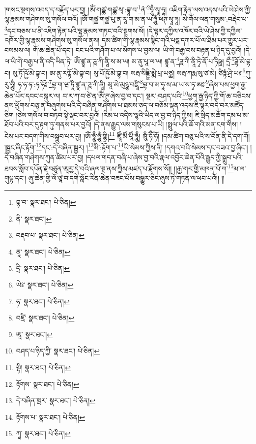 །གསང་སྔགས་འབད་ད་བརྗོད་པར་བྱ། །ཨོཾ་གཙྪ་གཙྪ་སྭ་:བྷཱ་བ་\footnote{བྷ་བ་  སྣར་ཐང་།  པེ་ཅིན། }ནཾ་\footnote{ནི་  སྣར་ཐང་། }ཧཱུྃ་སྭཱ་ཧཱ། འཇིག་རྟེན་ལས་འདས་པའི་ཡེ་ཤེས་ཀྱི་ལྷ་རྣམས་གཤེགས་སུ་གསོལ་བའོ། །ཨོཾ་གཙྪ་གཙྪ་པུ་ན་རཱ་ག་མ་ན་ཡ་ཧཱུྃ་ཕཊ་སྭཱ་ཧཱ། སེ་གོལ་ལན་གསུམ་:བརྡེབ་པ་\footnote{བརྡབ་པ་  སྣར་ཐང་།  པེ་ཅིན། }དང་བཅས་པ་ནི་འཇིག་རྟེན་པའི་ལྷ་རྣམས་གཏང་བའི་སྔགས་སོ། །དེ་ལྟར་དཀྱིལ་འཁོར་བའི་ཡེ་ཤེས་ཀྱི་དཀྱིལ་འཁོར་གྱི་ལྷ་རྣམས་གཤེགས་སུ་གསོལ་ནས། དམ་ཚིག་གི་ལྷ་རྣམས་སྙིང་གའི་པདྨ་དཀར་པོ་ལ་ཐིམ་པར་གྱུར་པར་བསམས་ལ། གོ་ཆ་ཆེན་པོ་དང་། ངང་པའི་གཤོག་པ་ལ་སོགས་པ་བྱས་ལ། ཡི་གེ་བརྒྱ་བས་བརྟན་པ་ཉིད་དུ་བྱའོ། །དེ་ལ་ཡི་གེ་བརྒྱ་པ་ནི་འདི་ཡིན་ཏེ། ཨོཾ་ཛྙཱ་ན་ཌཱ་ཀི་ནཱི་ས་མ་ཡ། མ་ནུ་པཱ་ལ་ཡ། ཛྙཱ་ན་\footnote{ནཱ་  སྣར་ཐང་།  པེ་ཅིན། }ཌཱ་ཀི་ནཱི་ཏྭེ་ནོ་པ་ཏིཥྛ། དྲྀ་\footnote{དྲི་  སྣར་ཐང་།  པེ་ཅིན། }ཌྷོ་མེ་བྷ་བ། སུ་ཏོ་ཥྱོ་མེ་བྷ་བ། ཨ་ནུ་རཀྟོ་མེ་བྷ་བ། སུ་པོ་ཥྱོ་མེ་བྷ་བ། སརྦ་སིདྡྷི་མྨེ་པྲ་ཡཙྪ། སརྦ་ཀརྨ་སུ་ཙ་མེ། ཙིཏྟཾ་ཤྲེ་ཡཿ་\footnote{ཡེཿ་  སྣར་ཐང་།  པེ་ཅིན། }ཀུ་རུ་ཧཱུྃ། ཧ་ཧ་ཧ་:ཧ་ཧོཿ་\footnote{ཧ་  སྣར་ཐང་།  པེ་ཅིན། }བྷ་ག་ཝ་ཏཱི་ཛྙཱ་ན་ཌཱ་ཀི་ནཱི། མཱ་མེ་མུཉྩ་བཛྲཱི་\footnote{བཛྲི་  སྣར་ཐང་།  པེ་ཅིན། }བྷ་བ་མ་ཧཱ་ས་མ་ཡ་ས་ཏྭ་ཨཿ་\footnote{ཨཱ་  སྣར་ཐང་། }ཞེས་པས་ཕྱག་རྒྱ་ཆེན་པོར་དབང་བསྐུར་ལ། བ་ར་ཀ་བ་ཙེ་ན་ཨོཾ་ཊུ་ཞེས་བྱ་བ་དང་། སྔར་:བཤད་པའི་\footnote{བཤད་པ་ཉིད་ཀྱི་  སྣར་ཐང་།  པེ་ཅིན། }ཕྱག་རྒྱ་ཉིད་ཀྱི་གོ་ཆ་བཅིངས་ནས་ཕྱོགས་བཅུ་ན་བཞུགས་པའི་དེ་བཞིན་གཤེགས་པ་ཐམས་ཅད་ལ་བཅོམ་ལྡན་འདས་ཇི་ལྟར་བདེ་བར་མཛོད་ཅིག །ཅེས་གསོལ་བ་བཏབ་སྟེ་ལྡང་བར་བྱའོ། །རིམ་པ་འདིས་ལྷའི་ཡིད་ལ་བྱ་བ་ཉིད་ཀྱིས། ཇི་སྲིད་མཆོག་དམ་པ་མ་ཐོབ་པའི་བར་དུ་རྟག་ཏུ་གནས་པར་བྱའོ། །དེ་ནས་རྒྱུད་ལས་གསུངས་པ་ཡི། །སྤྲུལ་པའི་ཆོ་གའི་མན་ངག་གིས། །
ངེས་པར་བདག་གིས་བསྒྲུབ་པར་བྱ། །ཨོཾ་ཧཱུྃ་ཧཱུྃ་གྷྲི།\footnote{གྷི།  སྣར་ཐང་།  པེ་ཅིན། } ཛྲཱིཾ་མིཾ་པཱིཾ་ཧཱུྃ། ཁྲུྃ་ཧོྃ་ཧོ། །དམ་ཚིག་བཅུ་པའི་ས་བོན་ནི་དེ་དག་གོ། །སྦྱང་ཞིང་རྟོག་\footnote{རྟོགས་  སྣར་ཐང་།  པེ་ཅིན། }དང་:དེ་བཞིན་སྦྱར། །\footnote{དེ་བཞིན་སྦར་  སྣར་ཐང་།  པེ་ཅིན། }མི་:རྟོག་པ་\footnote{རྟོགས་པ་  སྣར་ཐང་།  པེ་ཅིན། }ཡི་སེམས་ཀྱིས་ནི། །དགའ་བའི་སེམས་དང་བཟའ་བྱ་ཞིང་། །དེ་བཞིན་གཤེགས་ཀུན་ཚིམ་པར་བྱ། །དཔལ་གདན་བཞི་པ་ཞེས་བྱ་བའི་རྣལ་འབྱོར་ཆེན་པོའི་རྒྱུད་ཀྱི་སྒྲུབ་པའི་ཐབས་སློབ་དཔོན་རྗེ་བཙུན་ཨཱརྱ་དེ་བའི་ཞལ་སྔ་ནས་ཀྱིས་མཛད་པ་རྫོགས་སོ།། །།རྒྱ་གར་གྱི་མཁན་པོ་ཀ་\footnote{ཀཱ་  སྣར་ཐང་།  པེ་ཅིན། }མ་ལ་གུཔྟ་དང་། ཞུ་ཆེན་གྱི་ལོ་ཙཱ་བ་དགེ་སློང་རིན་ཆེན་བཟང་པོས་བསྒྱུར་ཅིང་ཞུས་ཏེ་གཏན་ལ་ཕབ་པའོ།། །།